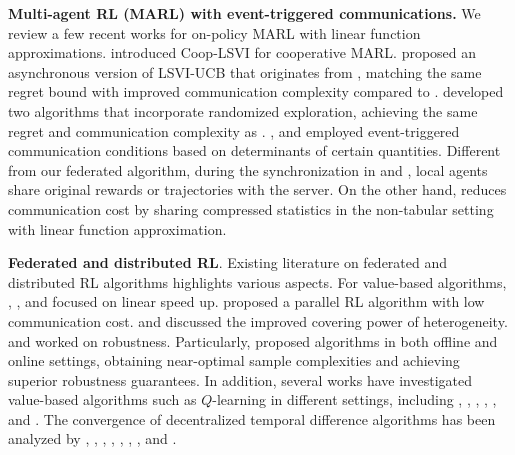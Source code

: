 \textbf{Multi-agent RL (MARL) with event-triggered communications.} We review a few recent works for on-policy MARL with linear function approximations. \citet{dubey2021provably} introduced Coop-LSVI for cooperative MARL. \citet{min2023cooperative} proposed an asynchronous version of LSVI-UCB that originates from \citet{jin2020provably}, matching the same regret bound with improved communication complexity compared to \citet{dubey2021provably}. \citet{hsu2024randomized} developed two algorithms that incorporate randomized exploration, achieving the same regret and communication complexity as \citet{min2023cooperative}. \citet{dubey2021provably}, \citet{min2023cooperative} and \citet{hsu2024randomized} employed event-triggered communication conditions based on determinants of certain quantities. Different from our federated algorithm, during the synchronization in \citet{dubey2021provably} and \citet{min2023cooperative}, local agents share original rewards or trajectories with the server. On the other hand, \citet{hsu2024randomized} reduces communication cost by sharing compressed statistics in the non-tabular setting with linear function approximation.

\textbf{Federated and distributed RL}. Existing literature on federated and distributed RL algorithms highlights various aspects. For value-based algorithms, \cite{guo2015concurrent}, \cite{zheng2023federated}, and \cite{woo2023blessing} focused on  linear speed up. \citep{agarwal2021communication} proposed a parallel RL algorithm with low communication cost. \cite{woo2023blessing} and \cite{woo2024federated} discussed the improved covering power of heterogeneity. \cite{wu2021byzantine} and \cite{chen2023byzantine} worked on robustness. Particularly, \cite{chen2023byzantine} proposed algorithms in both offline and online settings, obtaining near-optimal sample complexities and achieving superior robustness guarantees. In addition, several works have investigated value-based algorithms such as $Q$-learning in different settings, including \cite{beikmohammadi2024compressed}, \cite{jin2022federated}, \cite{khodadadian2022federated}, \cite{fan2023fedhql}, \cite{woo2023blessing}, and \cite{woo2024federated,anwar2021multi,zhao2023federated,yang2023federated,zhang2024finite}.  The convergence of decentralized temporal difference algorithms has been analyzed by \cite{doan2019finite}, \cite{doan2021finite}, \cite{chen2021multi}, \cite{sun2020finite}, \cite{wai2020convergence}, \cite{wang2020decentralized}, \cite{zeng2021finite}, and \cite{liu2023distributed}. 


